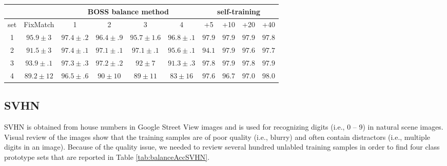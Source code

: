 \documentclass[final]{cvpr}
\begin{document}
\begin{table*}
	\begin{center}
		\begin{tabular}{|c|c|c|c|c|c|c|c|c|c|}
			\hline
			&  & \multicolumn{4}{|c|}{BOSS balance method} & \multicolumn{4}{|c|}{self-training}    \\
			\hline
			set  & FixMatch & 1 & 2 & 3 & 4 & +5 & +10 & +20 & +40    \\
			\hline\hline
			1 & $ 95.9 \pm 3 $  &  $ \mathbf{97.4 \pm .2} $  & $ 96.4 \pm .9 $  & $ 95.7 \pm 1.6 $ & $ 96.8 \pm .1 $ & $ 97.9 $ & $ 97.9 $ & $ 97.9 $ & $ 97.8 $   \\
			\hline
			2 & $ 91.5 \pm 3 $  &  $ \mathbf{97.4 \pm .1} $  & $ 97.1 \pm .1 $  & $ 97.1 \pm .1 $ & $ 95.6 \pm .1 $ & $ 94.1 $ & $ 97.9 $ & $ 97.6 $ & $ 97.7 $   \\
			\hline
			3 & $ 93.9 \pm .1 $  &  $ \mathbf{97.3 \pm .3} $  & $ 97.2 \pm .2 $  & $ 92 \pm 7 $ & $ 91.3 \pm .3 $ & $ 97.8 $ & $ 97.9 $ & $ 97.8 $ & $ 97.9 $   \\
			\hline
			4 & $ 89.2 \pm 12 $  &  $ \mathbf{96.5 \pm .6} $  & $ 90 \pm 10 $  & $ 89 \pm 11 $ & $ 83 \pm 16 $ & $ 97.6 $ & $ 96.7 $ & $ 97.0 $ & $ 98.0 $   \\
			\hline
			
		\end{tabular}
	\end{center}
	\caption{\textbf{SVHN.} BOSS methods are compared using four sets of class prototypes (i.e., 1 prototype per class) for SVHN.  The FixMatch column shows results for the original FixMatch code on the prototype sets. The next four columns gives the accuracy results for the class balance methods  Results are an average of test accuracies for four runs.  The self-training iteration was performed on the results from the class balancing shown in bold.
	}
	\label{tab:balanceAccSVHN}
\end{table*}

\subsection{SVHN}
\label{sec:svhn}

SVHN is obtained from house numbers in Google Street View images and is used for recognizing digits (i.e., 0 -- 9) in natural scene images. 
Visual review of the images show that the training samples are of poor quality (i.e., blurry) and often contain distractors (i.e.,  multiple digits in an image).
Because of the quality issue, we needed to review several hundred unlabled training samples in order to find four class prototype sets that are reported in Table \ref{tab:balanceAccSVHN}.
\end{document}
